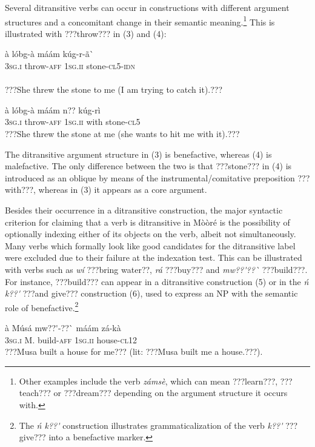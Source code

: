 \documentclass[output=paper]{langsci/langscibook}
\begin{document}
Several ditransitive verbs can occur in constructions with different argument structures and a concomitant change in their semantic meaning.\footnote{ Other examples include the verb \textit{zámsè}, which can mean ???learn???, ???teach??? or ???dream??? depending on the argument structure it occurs with. } This is illustrated with ???throw??? in (3) and (4):  


\ea 
\gll à    lóbg-à    máám    kúg-r-ã\`{ }\\
\textsc{3sg.i  }  throw-\textsc{aff}  \textsc{1sg.ii  }  stone-\textsc{cl5-idn}\\
\\\glt???She threw the stone to me (I am trying to catch it).???

\z


\ea \gll 
\label{bkm:Ref446636099}à    lóbg-à    máám    n??  kúg-rì
\\
%
\textsc{3sg.i  }  throw-\textsc{aff}  \textsc{1sg.ii  }  with  stone-\textsc{cl5}
\\\glt
???She threw the stone at me (she wants to hit me with it).???
\z

The ditransitive argument structure in (3) is benefactive, whereas (4) is malefactive. The only difference between the two is that ???stone??? in (4) is introduced as an oblique by means of the instrumental/comitative preposition ???with???, whereas in (3) it appears as a core argument. 

Besides their occurrence in a ditransitive construction, the major syntactic criterion for claiming that a verb is ditransitive in Mòòré is the possibility of optionally indexing either of its objects on the verb, albeit not simultaneously. Many verbs which formally look like good candidates for the ditransitive label were excluded due to their failure at the indexation test. This can be illustrated with verbs such as \textit{wí} ???bring water??, \textit{rá} ???buy??? and \textit{mw??\'{ }??\`{ }} ???build???. For instance, ???build??? can appear in a ditransitive construction (5) or in the \textit{\'{n} k??\'{ }} ???and give??? construction (6), used to express an NP with the semantic role of benefactive.\footnote{ The\textit{ \'{n} k??\'{ }} construction illustrates grammaticalization of the verb \textit{k??\'{ }} ???give??? into a benefactive marker.} 

\ea \gll 
\label{bkm:Ref446636172}à    Músá  mw??\'{ }-??\`{ }    máám    zá-kà
\\
%
\textsc{3sg.i  }  M.  build-\textsc{aff}  \textsc{1sg.ii  }  house-\textsc{cl12}
\\\glt
???Musa built a house for me??? (lit: ???Musa built me a house.???). 
\z
\end{document}

